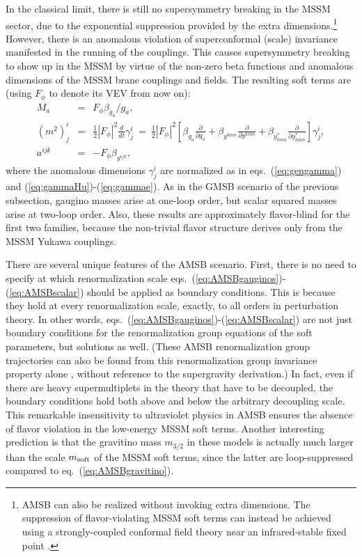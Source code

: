 \documentclass[11pt]{article}
\def\beq{\begin{eqnarray}}
\def\eeq{\end{eqnarray}}
\def\mAMSB{F_\phi}
\begin{document}
In the classical limit, there is still no supersymmetry breaking in the 
MSSM sector, due to the exponential suppression provided by the extra 
dimensions.\footnote{AMSB can also be realized without invoking extra 
dimensions. The suppression of flavor-violating MSSM soft terms can 
instead be achieved using a strongly-coupled conformal field theory near 
an infrared-stable fixed point \cite{AMSBinfourd}.} However, there is an 
anomalous violation of superconformal (scale) invariance manifested in the 
running of the couplings. This causes supersymmetry breaking to show up in 
the MSSM by virtue of the non-zero beta functions and anomalous dimensions 
of the MSSM brane couplings and
fields. The resulting soft terms are \cite{AMSB} (using 
$\mAMSB$ to denote its VEV from now on):
\beq
M_a &=& \mAMSB \beta_{g_a}/g_a ,
\label{eq:AMSBgauginos}
\\
(m^2)_j^i &=& \frac{1}{2} |\mAMSB|^2 \frac{d}{dt} \gamma_j^i
\>=\> \frac{1}{2} |\mAMSB|^2 \left [
\beta_{g_a} \frac{\partial}{\partial g_a} 
+ \beta_{y^{kmn}} \frac{\partial}{\partial y^{kmn}}
+ \beta_{y^*_{kmn}} \frac{\partial}{\partial y^*_{kmn}}  \right]  \gamma_j^i,
\label{eq:AMSBscalars}
\\
a^{ijk} &=& -\mAMSB \beta_{y^{ijk}},
\label{eq:AMSBscalar}
\eeq
where the anomalous dimensions $\gamma^i_j$ are normalized as in 
eqs.~(\ref{eq:gengamma}) and (\ref{eq:gammaHu})-(\ref{eq:gammae}). As in 
the GMSB scenario of the previous subsection, gaugino masses arise at 
one-loop order, but scalar squared masses arise at two-loop order. Also, 
these results are approximately flavor-blind for the first two families, 
because the non-trivial flavor structure derives only from the MSSM Yukawa 
couplings.

There are several unique features of the AMSB scenario. First, there is no 
need to specify at which renormalization scale 
eqs.~(\ref{eq:AMSBgauginos})-(\ref{eq:AMSBscalar}) should be applied as 
boundary conditions. This is because they hold at every renormalization 
scale, exactly, to all orders in perturbation theory. In other words, 
eqs.~(\ref{eq:AMSBgauginos})-(\ref{eq:AMSBscalar}) are not just boundary 
conditions for the renormalization group equations of the soft parameters, 
but solutions as well. (These AMSB renormalization group trajectories can 
also be found from this renormalization group invariance property alone 
\cite{AMSBtrajectories}, without reference to the supergravity 
derivation.) In fact, even if there are heavy supermultiplets in the 
theory that have to be decoupled, the boundary conditions hold both above 
and below the arbitrary decoupling scale. This remarkable insensitivity to 
ultraviolet physics in AMSB ensures the absence of flavor 
violation in the low-energy MSSM soft terms. Another interesting 
prediction is that the gravitino mass $m_{3/2}$ in these models is 
actually much larger than the scale $m_{\rm soft}$ of the MSSM soft terms, 
since the latter are loop-suppressed compared to 
eq.~(\ref{eq:AMSBgravitino}).
\end{document}
